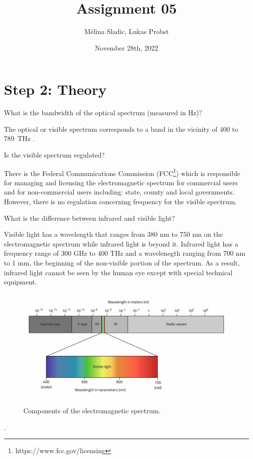 \documentclass[
	12pt, %
]{fphw}
\title{Assignment 05} %
\author{Mélina Sladic, Lukas Probst} %
\date{November 28th, 2022} %
\institute{Eidgenössische Technische Hochschule Zürich} %
\begin{document}
\maketitle %


\section*{Step 2: Theory}

\begin{problem}
	What is the bandwidth of the optical spectrum (measured in Hz)?
\end{problem}
The optical or visible spectrum corresponds to a band in the vicinity of 400 to 789 THz \cite{20.500.11850/125771}.

\begin{problem}
	Is the visible spectrum regulated?
\end{problem}
There is the Federal Communications Commission (FCC\footnote{https://www.fcc.gov/licensing}) which is responsible for managing and licensing the electromagnetic spectrum for commercial users and for non-commercial users including: state, county and local governments. However, there is no regulation concerning frequency for the visible spectrum.

\begin{problem}
	What is the difference between infrared and visible light?
\end{problem}
Visible light has a wavelength that ranges from 380 nm to 750 nm on the electromagnetic spectrum while infrared light is beyond it. Infrared light has a frequency range of 300 GHz to 400 THz and a wavelenegth ranging from 700 nm to 1 mm, the beginning of the non-visible portion of the spectrum. As a result, infrared light cannot be seen by the human eye except with special technical equipment. 
\begin{figure}[!htbp] 
	\centering
	\includegraphics[width=1\columnwidth]{figures/electromagnetic_spectrum.png}
	\caption{Components of the electromagnetic spectrum.}
	\label{fig:electromagnetic_spectrum}
\end{figure}
\FloatBarrier. 
\end{document}
